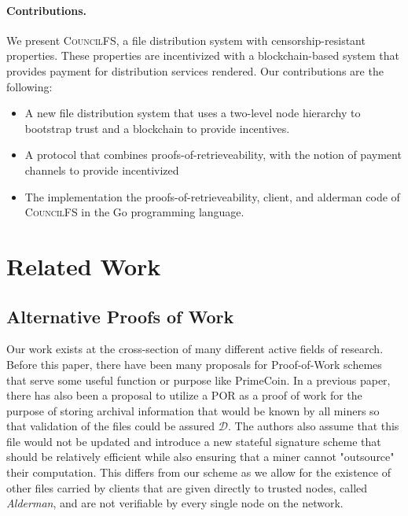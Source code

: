 \documentclass{article}
\begin{document}
\paragraph{Contributions.} We present \textsc{CouncilFS}, a file distribution
system with censorship-resistant properties. These properties are incentivized
with a blockchain-based system that provides payment for distribution services
rendered. Our contributions are the following:
\begin{itemize}
\item A new file distribution system that uses a two-level node hierarchy to
  bootstrap trust and a blockchain to provide incentives.
\item A protocol that combines proofs-of-retrieveability, with the
  notion of payment channels to provide incentivized 
\item The implementation the proofs-of-retrieveability, client, and alderman
  code of \textsc{CouncilFS} in the Go programming language.
\end{itemize}

\section{Related Work}
\subsection{Alternative Proofs of Work}
Our work exists at the cross-section of many different active fields of research. Before this paper, there have been many proposals for Proof-of-Work schemes that serve some useful function or purpose like PrimeCoin. In a previous paper, there has also been a proposal to utilize a POR as a proof of work for the purpose of storing archival information that would be known by all miners so that validation of the files could be assured $\mathcal{D}$. The authors also assume that this file would not be updated and introduce a new stateful signature scheme that should be relatively efficient while also ensuring that a miner cannot "outsource" their computation. This differs from our scheme as we allow for the existence of other files carried by clients that are given directly to trusted nodes, called \emph{Alderman}, and are not verifiable by every single node on the network.\\
\end{document}
